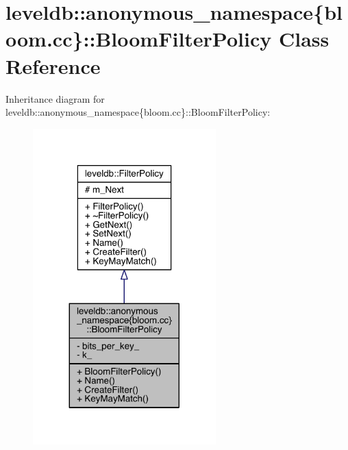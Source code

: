 \hypertarget{classleveldb_1_1anonymous__namespace_02bloom_8cc_03_1_1_bloom_filter_policy}{}\section{leveldb\+:\+:anonymous\+\_\+namespace\{bloom.\+cc\}\+:\+:Bloom\+Filter\+Policy Class Reference}
\label{classleveldb_1_1anonymous__namespace_02bloom_8cc_03_1_1_bloom_filter_policy}


Inheritance diagram for leveldb\+:\+:anonymous\+\_\+namespace\{bloom.\+cc\}\+:\+:Bloom\+Filter\+Policy\+:
\nopagebreak
\begin{figure}[H]
\begin{center}
\leavevmode
\includegraphics[width=200pt]{classleveldb_1_1anonymous__namespace_02bloom_8cc_03_1_1_bloom_filter_policy__inherit__graph}
\end{center}
\end{figure}


